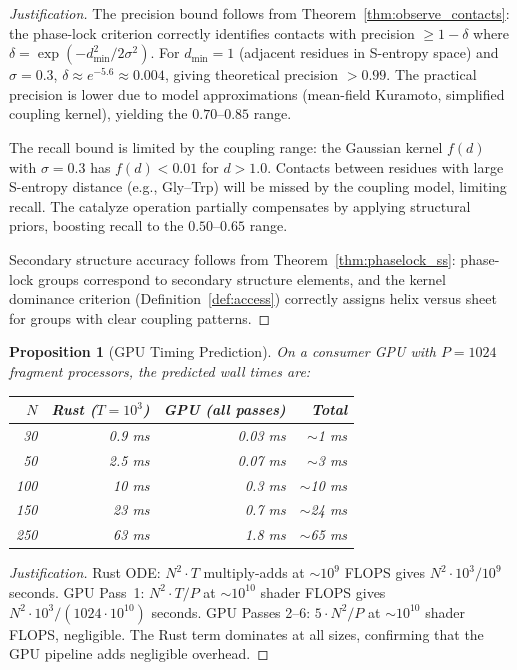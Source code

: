 \documentclass[11pt,twocolumn,a4paper]{article}
\newtheorem{proposition}[theorem]{Proposition}
\theoremstyle{definition}
\theoremstyle{remark}
\begin{document}
\begin{proof}[Justification]
The precision bound follows from Theorem~\ref{thm:observe_contacts}: the phase-lock criterion correctly identifies contacts with precision $\geq 1 - \delta$ where $\delta = \exp(-d_{\min}^2/2\sigma^2)$. For $d_{\min} = 1$ (adjacent residues in S-entropy space) and $\sigma = 0.3$, $\delta \approx e^{-5.6} \approx 0.004$, giving theoretical precision $> 0.99$. The practical precision is lower due to model approximations (mean-field Kuramoto, simplified coupling kernel), yielding the $0.70$--$0.85$ range.

The recall bound is limited by the coupling range: the Gaussian kernel $f(d)$ with $\sigma = 0.3$ has $f(d) < 0.01$ for $d > 1.0$. Contacts between residues with large S-entropy distance (e.g., Gly--Trp) will be missed by the coupling model, limiting recall. The catalyze operation partially compensates by applying structural priors, boosting recall to the $0.50$--$0.65$ range.

Secondary structure accuracy follows from Theorem~\ref{thm:phaselock_ss}: phase-lock groups correspond to secondary structure elements, and the kernel dominance criterion (Definition~\ref{def:access}) correctly assigns helix versus sheet for groups with clear coupling patterns.
\end{proof}

\begin{proposition}[GPU Timing Prediction]
\label{prop:gpu_timing}
On a consumer GPU with $P = 1024$ fragment processors, the predicted wall times are:
\begin{center}
\small
\begin{tabular}{@{}rrrr@{}}
\toprule
$N$ & Rust ($T=10^3$) & GPU (all passes) & Total \\
\midrule
30  & 0.9 ms & 0.03 ms & $\sim$1 ms \\
50  & 2.5 ms & 0.07 ms & $\sim$3 ms \\
100 & 10 ms  & 0.3 ms  & $\sim$10 ms \\
150 & 23 ms  & 0.7 ms  & $\sim$24 ms \\
250 & 63 ms  & 1.8 ms  & $\sim$65 ms \\
\bottomrule
\end{tabular}
\end{center}
\end{proposition}

\begin{proof}[Justification]
Rust ODE: $N^2 \cdot T$ multiply-adds at $\sim 10^9$ FLOPS gives $N^2 \cdot 10^3 / 10^9$ seconds. GPU Pass~1: $N^2 \cdot T / P$ at $\sim 10^{10}$ shader FLOPS gives $N^2 \cdot 10^3 / (1024 \cdot 10^{10})$ seconds. GPU Passes 2--6: $5 \cdot N^2 / P$ at $\sim 10^{10}$ shader FLOPS, negligible. The Rust term dominates at all sizes, confirming that the GPU pipeline adds negligible overhead.
\end{proof}
\end{document}
